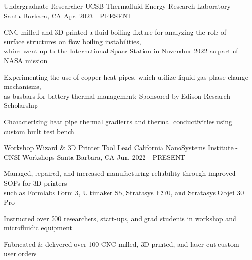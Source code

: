 \begin{cventries}
\cventry
{Undergraduate Researcher} %
{UCSB Thermofluid Energy Research Laboratory} %
{Santa Barbara, CA} %
{Apr. 2023 - PRESENT} %
{ %
\begin{cvitems}   
\item {CNC milled and 3D printed a fluid boiling fixture for analyzing the role of surface structures on flow boiling instabilities,\\ which went up to the International Space Station in November 2022 as part of NASA mission}
\item {Experimenting the use of copper heat pipes, which utilize liquid-gas phase change mechanisms,\\ as busbars for battery thermal management; Sponsored by Edison Research Scholarship}
\item {Characterizing heat pipe thermal gradients and thermal conductivities using custom built test bench}
\end{cvitems}
}



\cventry
{Workshop Wizard \& 3D Printer Tool Lead} %
{California NanoSystems Institute - CNSI Workshops} %
{Santa Barbara, CA} %
{Jun. 2022 - PRESENT} %
{ %
\begin{cvitems}
\item {Managed, repaired, and increased manufacturing reliability through improved SOPs for 3D printers \\ such as Formlabs Form 3,  Ultimaker S5, Stratasys F270, and Stratasys Objet 30 Pro}
\item {Instructed over 200 researchers, start-ups, and grad students in workshop and microfluidic equipment}
\item {Fabricated \& delivered over 100 CNC milled, 3D printed, and laser cut custom user orders }
\end{cvitems}
}






\end{cventries}
